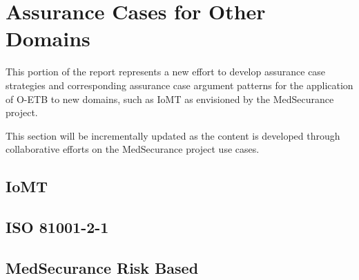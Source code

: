 \documentclass[12pt,twoside,a4paper]{article}
\begin{document}
\newpage
\section{Assurance Cases for Other Domains}\label{sec:ac-other}
This portion of the report represents a new effort to develop assurance case strategies and corresponding assurance case argument patterns for the application of O-ETB to new domains, such as IoMT as envisioned by the MedSecurance project.

This section will be incrementally updated as the content is developed through collaborative efforts on the MedSecurance project use cases.

\subsection{IoMT}
\subsection{ISO 81001-2-1}
\cite{ISO-81001-2-1}

\subsection{MedSecurance Risk Based}




\clearpage




\clearpage
\end{document}

